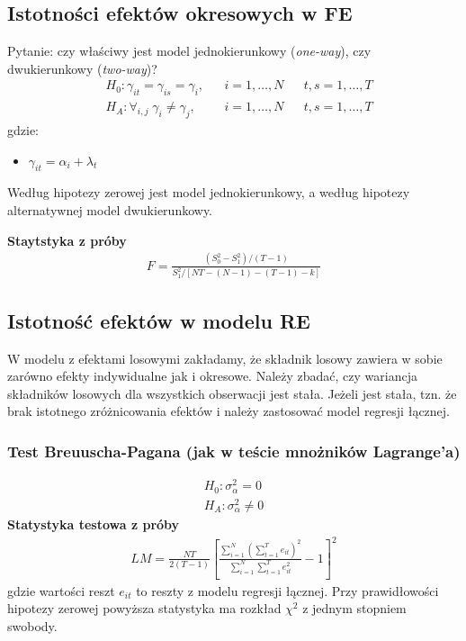 \subsection{Istotności efektów okresowych w FE}
Pytanie: czy właściwy jest model jednokierunkowy (\emph{one-way}), czy dwukierunkowy (\emph{two-way})?
\begin{align*}
&H_0:\gamma_{it}=\gamma_{is}=\gamma_i,&&i=1,\dots,N&&t,s=1,\dots,T\\
&H_A:\forall_{i,j}\;\gamma_i\neq\gamma_j,&&i=1,\dots,N&&t,s=1,\dots,T
\end{align*}
gdzie:
\begin{itemize}
\item $ \gamma_{it}=\alpha_i+\lambda_t $
\end{itemize}
Według hipotezy zerowej jest model jednokierunkowy, a według hipotezy alternatywnej model dwukierunkowy.

\textbf{Staytstyka z próby}
\begin{gather*}
F=\frac{(S_0^2-S_1^2)/(T-1)}{S_1^2/[NT-(N-1)-(T-1)-k]}
\end{gather*}
\subsection{Istotność efektów w modelu RE}
W modelu z efektami losowymi zakładamy, że składnik losowy zawiera w sobie zarówno efekty indywidualne jak i okresowe. Należy zbadać, czy wariancja składników losowych dla wszystkich obserwacji jest stała. Jeżeli jest stała, tzn. że brak istotnego zróżnicowania efektów i należy zastosować model regresji łącznej.
\subsubsection{Test Breuuscha-Pagana (jak w teście mnożników Lagrange'a)}
\begin{gather*}
H_0:\sigma_\alpha^2=0\\
H_A:\sigma_\alpha^2\neq 0
\end{gather*}
\textbf{Statystyka testowa z próby}
\begin{gather*}
LM=\frac{NT}{2(T-1)}
\left[\frac{\sum\limits_{i=1}^{N}\left(\sum\limits_{t=1}^{T}e_{it}\right)^2}{\sum\limits_{i=1}^{N}\sum\limits_{t=1}^{T}e_{it}^2}-1\right]^2
\end{gather*}
gdzie wartości reszt $ e_{it} $ to reszty z modelu regresji łącznej. Przy prawidłowości hipotezy zerowej powyższa statystyka ma rozkład $ \chi^2 $ z jednym stopniem swobody.
